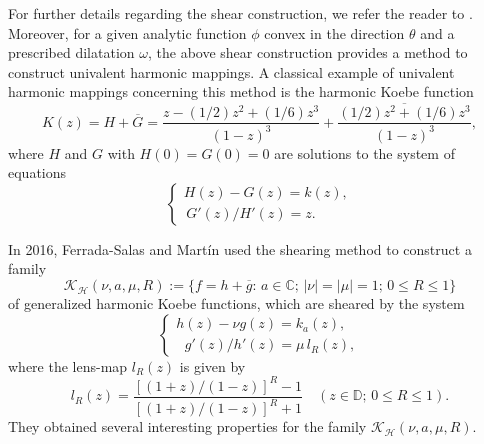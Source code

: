 \documentclass[11pt, reqno]{amsart}
\numberwithin{equation}{section}
\newcommand{\R}{\mbox{$\mathbb{R}$}}
\newcommand{\C}{\mbox{$\mathbb{C}$}}
\newcommand{\D}{\mbox{$\mathbb{D}$}}
\begin{document}
For further details regarding the shear construction, we refer the reader to \cite{fhm,kpv,mpq,wang}.
Moreover, for a given analytic function $\phi$ convex in the direction $\theta$ and a prescribed dilatation $\omega$, the above shear construction provides a method to construct univalent harmonic mappings. %
A classical example of univalent harmonic mappings concerning this method is the harmonic Koebe function 
\begin{equation}
    {K}(z)=H+\overline{G}=\dfrac{z-({1}/{2})z^2+({1}/{6})z^3}{(1-z)^3}+\overline {\dfrac{({1}/{2})z^2+({1}/{6})z^3}{(1-z)^3}},
\end{equation}
where $H$ and $G$ with $H(0)=G(0)=0$ are solutions to the system of equations 
\begin{equation*}\label{15}
    \begin{cases}
        H(z)-G(z)=k(z),\\
      \,  {G'(z)}/{H'(z)}=z.
    \end{cases}
\end{equation*}



In 2016, Ferrada-Salas and Mart\'in \cite{fm} used the shearing method  to construct a family $$\mathcal {K_H}(\nu,a,\mu,R):=\{f=h+\overline{g}:\, a\in\C;\,|\nu|=|\mu|=1;\,0\leq R\leq1\}$$ of generalized harmonic Koebe functions, which are sheared by
the system
\begin{equation*}\label{8}
    \begin{cases}
        h(z)-\nu g(z)=k_a(z),\\%
        \ \ \, g'(z)/h'(z)=\mu\, l_R(z),
    \end{cases}
\end{equation*}
where the lens-map $l_R(z)$ is given by
\begin{equation*}\label{7}
    l_R(z)=\dfrac{\left[{(1+z)}/{(1-z)}\right]^R-1}{\left[{(1+z)}/{(1-z)}\right]^R+1}\quad(z\in\D;\,0\leq R\leq1).
\end{equation*}
They obtained %
several interesting properties for the family $\mathcal {K_H}(\nu,a,\mu,R)$. 
\end{document}
